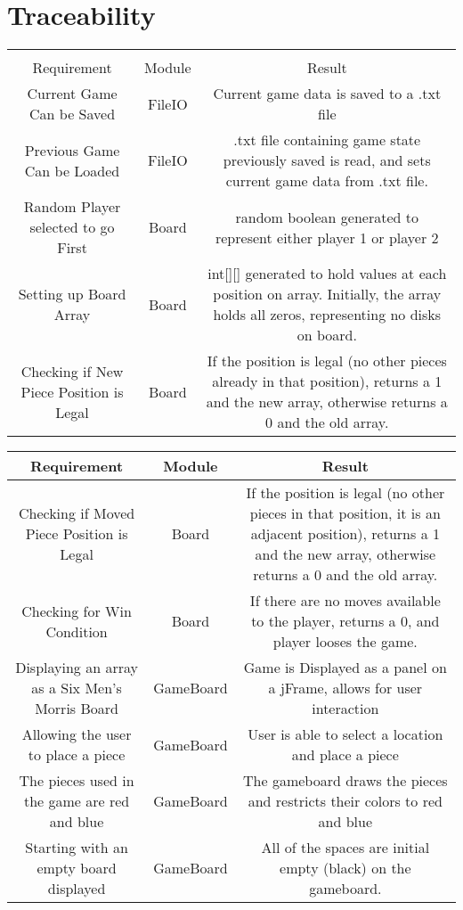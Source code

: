 \documentclass[12pt]{article}
\begin{document}
	\section{Traceability}
	\begin{tabularx}{\linewidth}{|C|C|C|}
		\hline \\
		Requirement & Module & Result \\
\hline
Current Game Can be Saved & FileIO & Current game data is saved to a .txt file\\
\hline
Previous Game Can be Loaded & FileIO & .txt file containing game state previously saved is read, and sets current game data from .txt file.\\
\hline
Random Player selected to go First & Board & random boolean generated to represent either player 1 or player 2 \\
\hline 
Setting up Board Array & Board & int[][] generated to hold values at each position on array. Initially, the array holds all zeros, representing no disks on board. \\
\hline 
Checking if New Piece Position is Legal & Board & If the position is legal (no other pieces already in that position), returns a 1 and the new array, otherwise returns a 0 and the old array. \\ 
\hline 

	
	\end{tabularx}
		\begin{tabularx}{\linewidth}{|C|C|C|}
			\hline 
			Requirement & Module & Result \\
			\hline 
			Checking if Moved Piece Position is Legal & Board & If the position is legal (no other pieces in that position, it is an adjacent position), returns a 1 and the new array, otherwise returns a 0 and the old array.\\
			\hline
			Checking for Win Condition & Board & If there are no moves available to the player, returns a 0, and player looses the game. \\
			\hline 	Displaying an array as a Six Men's Morris Board &
			GameBoard & Game is Displayed as a panel on a jFrame, allows for user interaction \\ 
			\hline 
			Allowing the user to place a piece & GameBoard &
			User is able to select a location and place a piece \\
			\hline 
			The pieces used in the game are red and blue & GameBoard & The gameboard draws the pieces and restricts their colors to red and blue \\
			\hline 
			Starting with an empty board displayed & GameBoard & All of the spaces are initial empty (black) on the gameboard. \\
			\hline 

	\end{tabularx}
\end{document}
